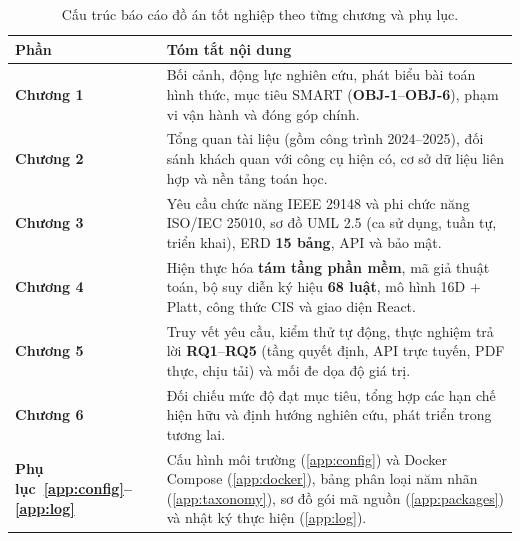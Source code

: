 \begin{table}[!htbp]
\centering
\caption[Cấu trúc báo cáo đồ án tốt nghiệp]{Cấu trúc báo cáo đồ án tốt nghiệp theo từng chương và phụ lục.}\label{tab:outline}
\begin{tabular}{|L{0.24}|L{0.76}|}
\hline
\textbf{Phần} & \textbf{Tóm tắt nội dung} \\
\hline
\textbf{Chương 1} & Bối cảnh, động lực nghiên cứu, phát biểu bài toán hình thức, mục tiêu SMART (\textbf{OBJ-1}--\textbf{OBJ-6}), phạm vi vận hành và đóng góp chính. \\
\hline
\textbf{Chương 2} & Tổng quan tài liệu (gồm công trình 2024--2025), đối sánh khách quan với công cụ hiện có, cơ sở dữ liệu liên hợp và nền tảng toán học. \\
\hline
\textbf{Chương 3} & Yêu cầu chức năng IEEE 29148 và phi chức năng ISO/IEC 25010, sơ đồ UML 2.5 (ca sử dụng, tuần tự, triển khai), ERD \textbf{15 bảng}, API và bảo mật. \\
\hline
\textbf{Chương 4} & Hiện thực hóa \textbf{tám tầng phần mềm}, mã giả thuật toán, bộ suy diễn ký hiệu \textbf{68 luật}, mô hình 16D + Platt, công thức CIS và giao diện React. \\
\hline
\textbf{Chương 5} & Truy vết yêu cầu, kiểm thử tự động, thực nghiệm trả lời \textbf{RQ1}--\textbf{RQ5} (tầng quyết định, API trực tuyến, PDF thực, chịu tải) và mối đe dọa độ giá trị. \\
\hline
\textbf{Chương 6} & Đối chiếu mức độ đạt mục tiêu, tổng hợp các hạn chế hiện hữu và định hướng nghiên cứu, phát triển trong tương lai. \\
\hline
\textbf{Phụ lục~\ref{app:config}--\ref{app:log}} & Cấu hình môi trường (\ref{app:config}) và Docker Compose (\ref{app:docker}), bảng phân loại năm nhãn (\ref{app:taxonomy}), sơ đồ gói mã nguồn (\ref{app:packages}) và nhật ký thực hiện (\ref{app:log}). \\
\hline
\end{tabular}
\end{table}
